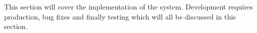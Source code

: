 \documentclass[../main.tex]{subfiles}
\begin{document}
\raggedright
This section will cover the implementation of the system. Development requires production, bug fixes and finally testing which will all be discussed in this section. 
\end{document}
